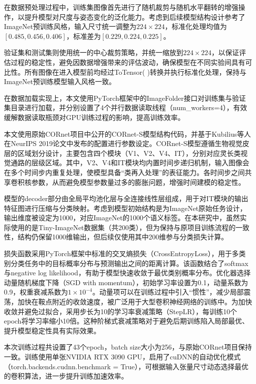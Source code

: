 在数据预处理过程中，训练集图像首先进行了随机裁剪与随机水平翻转的增强操作，以提升模型对尺度与姿态变化的泛化能力。考虑到后续模型结构设计参考了ImageNet预训练风格，输入尺寸统一调整为$224×224$，标准化处理均值为$[0.485,0.456,0.406]$，标准差为$[0.229,0.224,0.225]$。

验证集和测试集则使用统一的中心裁剪策略，并统一缩放到$224×224$，以保证评估过程的稳定性，避免因数据增强带来的评估波动，确保模型在不同实验间具有可比性。所有图像在进入模型前均经过ToTensor( )转换并执行标准化处理，保持与ImageNet预训练模型输入风格一致。

在数据加载实现上，本文使用PyTorch框架中的ImageFolder接口对训练集与验证集目录进行加载，并分别设置了4个并行数据读取线程（num\_workers=4），有效缓解数据读取瓶颈对GPU训练过程的影响，提高训练效率。

本文使用原始CORnet项目中公开的CORnet-S模型结构代码，并基于Kubilius等人在NeurIPS 2019论文中发布的配置进行参数设定\cite{kubilius2019brain}。CORnet-S模型遵循生物视觉皮层的区域划分设计，主要包含四个模块（V1、V2、V4、IT），分别对应灵长类视觉通路的层级区域。其中，V2、V4和IT模块均内置时间步递归机制，输入图像会在多个时间步内重复处理，使模型具备“类再入处理”的表征能力。各时间步之间共享卷积核参数，从而避免模型参数量过多的膨胀问题，增强时间建模的稳定性。

模型的decoder部分由全局平均池化层与全连接线性层组成，用于对IT模块的输出特征图进行压缩与分类映射。考虑到模型初始结构是为ImageNet原始任务设计，输出维度被设定为1000，对应ImageNet的1000个语义标签。在本研究中，虽然实际使用的是Tiny-ImageNet数据集（共200类），但为保持与原项目训练流程的一致性，结构仍保留1000维输出，但后续仅使用其中200维参与分类损失计算。

损失函数采用PyTorch框架中标准的交叉熵损失（CrossEntropyLoss），用于多类别分类任务中的目标概率分布与预测输出之间的距离计算。该函数结合了softmax与negative log likelihood，有助于模型快速收敛于最优类别概率分布\cite{mao2023cross}。优化器选择动量随机梯度下降（SGD with momentum），初始学习率设置为0.1，动量系数为0.9，权重衰减系数为$1\times 10^{-4}$。动量项可以在训练过程中引入“惯性”，减少局部震荡，加快在鞍点附近的收敛速度，被广泛用于大型卷积神经网络的训练中\cite{sutskever2013importance}。为加快收敛并避免过拟合，采用步长为10的学习率衰减策略（StepLR），每训练10个epoch将学习率缩小10倍。这种阶梯式衰减策略对于避免后期训练陷入局部最优、提升模型稳定性具有实际效果。

本次训练过程共设置了43个epoch，batch size大小为256，与原始CORnet项目保持一致。训练使用单张NVIDIA RTX 3090 GPU，启用了cuDNN的自动优化模式（torch.backends.cudnn.benchmark = True），可根据输入张量尺寸动态选择最优的卷积算法，进一步提升训练加速效率\cite{paszke2019pytorch}。

